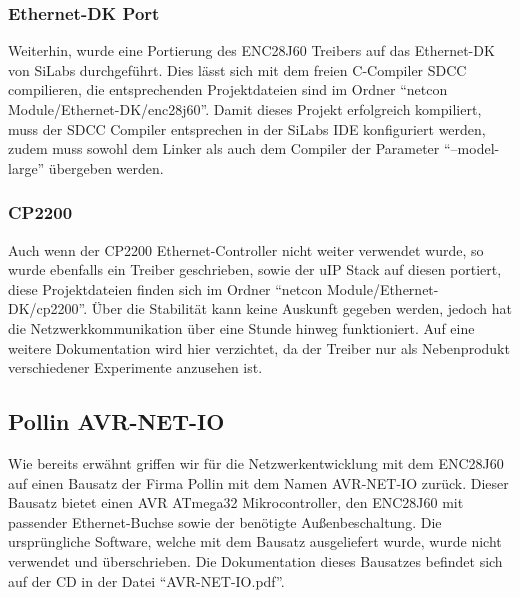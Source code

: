 \documentclass[a4paper,14pt,headsepline]{scrartcl}
\begin{document}
\subsubsection{Ethernet-DK Port}
Weiterhin, wurde eine Portierung des ENC28J60 Treibers auf das Ethernet-DK von SiLabs durchgeführt. Dies lässt sich mit dem freien C-Compiler SDCC compilieren, die entsprechenden Projektdateien sind im Ordner "`netcon Module/Ethernet-DK/enc28j60"'. Damit dieses Projekt erfolgreich kompiliert, muss der SDCC Compiler entsprechen in der SiLabs IDE konfiguriert werden, zudem muss sowohl dem Linker als auch dem Compiler der Parameter "`--model-large"' übergeben werden.

\subsubsection{CP2200}
Auch wenn der CP2200 Ethernet-Controller nicht weiter verwendet wurde, so wurde ebenfalls ein Treiber geschrieben, sowie der uIP Stack auf diesen portiert, diese Projektdateien finden sich im Ordner "`netcon Module/Ethernet-DK/cp2200"'. Über die Stabilität kann keine Auskunft gegeben werden, jedoch hat die Netzwerkkommunikation über eine Stunde hinweg funktioniert. Auf eine weitere Dokumentation wird hier verzichtet, da der Treiber nur als Nebenprodukt verschiedener Experimente anzusehen ist.

\subsection{Pollin AVR-NET-IO}
Wie bereits erwähnt griffen wir für die Netzwerkentwicklung mit dem ENC28J60 auf einen Bausatz der Firma Pollin mit dem Namen AVR-NET-IO zurück. Dieser Bausatz bietet einen AVR ATmega32 Mikrocontroller, den ENC28J60 mit passender Ethernet-Buchse sowie der benötigte Außenbeschaltung. Die ursprüngliche Software, welche mit dem Bausatz ausgeliefert wurde, wurde nicht verwendet und überschrieben. Die Dokumentation dieses Bausatzes befindet sich auf der CD in der Datei "`AVR-NET-IO.pdf"'.

\newpage
\end{document}
